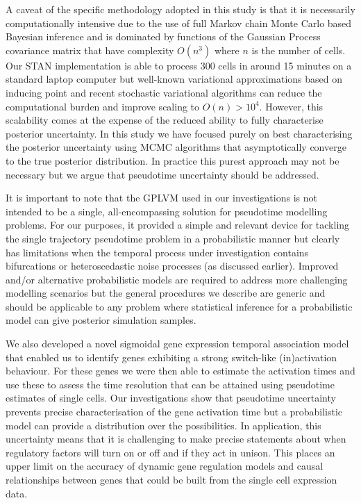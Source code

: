 A caveat of the specific methodology adopted in this study is that it is necessarily computationally intensive due to the use of full Markov chain Monte Carlo based Bayesian inference and is dominated by functions of the Gaussian Process covariance matrix that have complexity $O(n^3)$ where $n$ is the number of cells. Our STAN implementation is able to process 300 cells in around 15 minutes on a standard laptop computer but well-known variational approximations based on inducing point \cite{titsias2009variational} and recent stochastic variational algorithms \cite{hensman2013gaussian} can reduce the computational burden and improve scaling to $O(n) > 10^4$. However, this scalability comes at the expense of the reduced ability to fully characterise posterior uncertainty. In this study we have focused purely on best characterising the posterior uncertainty using MCMC algorithms that asymptotically converge to the true posterior distribution. In practice this purest approach may not be necessary but we argue that pseudotime uncertainty should be addressed.

It is important to note that the GPLVM used in our investigations is not intended to be a single, all-encompassing solution for pseudotime modelling problems. For our purposes, it provided a simple and relevant device for tackling the single trajectory pseudotime problem in a probabilistic manner but clearly has limitations when the temporal process under investigation contains bifurcations or heteroscedastic noise processes (as discussed earlier). Improved and/or alternative probabilistic models are required to address more challenging modelling scenarios but the general procedures we describe are generic and should be applicable to any problem where statistical inference for a probabilistic model can give posterior simulation samples.

We also developed a novel sigmoidal gene expression temporal association model that enabled us to identify genes exhibiting a strong switch-like (in)activation behaviour. For these genes we were then able to estimate the activation times and use these to assess the time resolution that can be attained using pseudotime estimates of single cells. Our investigations show that pseudotime uncertainty prevents precise characterisation of the gene activation time but a probabilistic model can provide a distribution over the possibilities. In application, this uncertainty means that it is challenging to make precise statements about when regulatory factors will turn on or off and if they act in unison. This places an upper limit on the accuracy of dynamic gene regulation models and causal relationships between genes that could be built from the single cell expression data.

